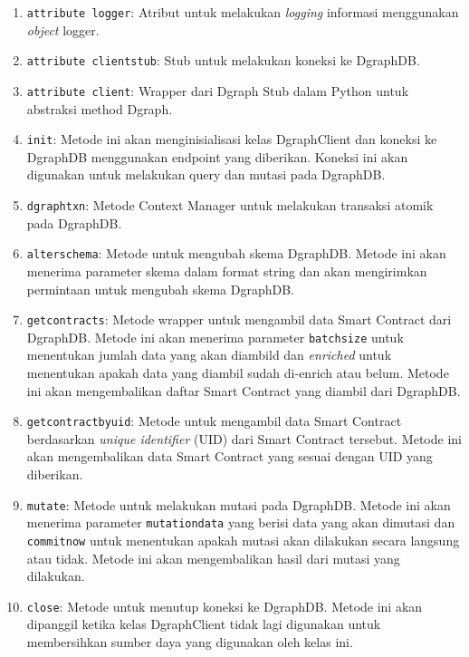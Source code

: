\begin{enumerate}
    \item \texttt{attribute logger}: Atribut untuk melakukan \textit{logging} informasi menggunakan \textit{object} logger.
    \item \texttt{attribute client\textunderscore stub}: Stub untuk melakukan koneksi ke DgraphDB.
    \item \texttt{attribute client}: Wrapper dari Dgraph Stub dalam Python untuk abstraksi method Dgraph.
    \item \texttt{\textunderscore\textunderscore init\textunderscore\textunderscore}: Metode ini akan menginisialisasi kelas DgraphClient dan koneksi ke DgraphDB menggunakan endpoint yang diberikan. Koneksi ini akan digunakan untuk melakukan query dan mutasi pada DgraphDB.
    \item \texttt{dgraph\textunderscore txn}: Metode Context Manager untuk melakukan transaksi atomik pada DgraphDB.
    \item \texttt{alter\textunderscore schema}: Metode untuk mengubah skema DgraphDB. Metode ini akan menerima parameter skema dalam format string dan akan mengirimkan permintaan untuk mengubah skema DgraphDB.
    \item \texttt{get\textunderscore contracts}: Metode wrapper untuk mengambil data Smart Contract dari DgraphDB. Metode ini akan menerima parameter \texttt{batch\textunderscore size} untuk menentukan jumlah data yang akan diambild dan \textit{enriched} untuk menentukan apakah data yang diambil sudah di-enrich atau belum. Metode ini akan mengembalikan daftar Smart Contract yang diambil dari DgraphDB.
    \item \texttt{get\textunderscore contract\textunderscore by\textunderscore uid}: Metode untuk mengambil data Smart Contract berdasarkan \textit{unique identifier} (UID) dari Smart Contract tersebut. Metode ini akan mengembalikan data Smart Contract yang sesuai dengan UID yang diberikan.
    \item \texttt{mutate}: Metode untuk melakukan mutasi pada DgraphDB. Metode ini akan menerima parameter \texttt{mutation\textunderscore data} yang berisi data yang akan dimutasi dan \texttt{commit\textunderscore now} untuk menentukan apakah mutasi akan dilakukan secara langsung atau tidak. Metode ini akan mengembalikan hasil dari mutasi yang dilakukan.
    \item \texttt{close}: Metode untuk menutup koneksi ke DgraphDB. Metode ini akan dipanggil ketika kelas DgraphClient tidak lagi digunakan untuk membersihkan sumber daya yang digunakan oleh kelas ini.
\end{enumerate}

